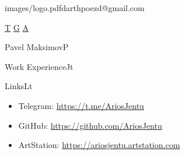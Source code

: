\documentclass[10pt]{extarticle}
\begin{document}
	
	\init

	\begin{sidebar}{images/logo.pdf}{darthpoezd@gmail.com}

		\hfill
		{
			\iconsfont\fontsize{20}{18}\selectfont
			\href{https://t.me/AriosJentu}{T}
			\href{https://github.com/AriosJentu}{G}
			\href{https://AriosJentu.artstation.com/}{A}
		}








	\end{sidebar}

	\begin{centralpart}{Pavel Maksimov}{P}{}
		
		\aboutprog

	\end{centralpart}

	\UpdatePosition
	
	\begin{centralpart}{Work Experience}{J}{t}

		\weteacher

		\wefecrc

	\end{centralpart}

	\BottomSignature

	\NewPage
	\ApplyNoSideBar
	\DrawSimpleSideBar

	\begin{centralpart}{}{}{}

		\wesoftwaretd

	\end{centralpart}

	\UpdatePosition

	\CentralProjects

	\BottomSignature
	\NewPage
	\DrawSimpleSideBar

	\CentralContributions

	\UpdatePosition
	\CentralEducation

	\UpdatePosition
	\begin{centralpart}{Links}{L}{t}
		\begin{titleblock}{}{}{}{}
			\vspace*{-25pt}
			\begin{itemize}[label=$\circ$]
				\item Telegram: {\color{sidetopsep}\href{https://t.me/AriosJentu}{https://t.me/AriosJentu}} \vp
				\item GitHub: {\color{sidetopsep}\href{https://github.com/AriosJentu}{https://github.com/AriosJentu}} \vp
				\item ArtStation: {\color{sidetopsep}\href{https://AriosJentu.artstation.com/}{https://ariosjentu.artstation.com}} \vp
			\end{itemize}
		\end{titleblock}
	\end{centralpart}
\end{document}
